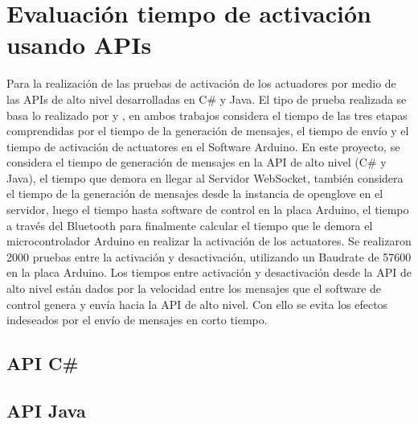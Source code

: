 \section{Evaluación tiempo de activación usando APIs}
 Para la realización de las pruebas de activación de los actuadores por medio de las APIs de alto nivel desarrolladas en C\# y Java. El tipo de prueba realizada se basa lo realizado por  \cite{tesis-monsalve-rodrigo} y  \cite{tesis-meneses-sebastian}, en ambos trabajos considera el tiempo de las tres etapas comprendidas por el tiempo de la generación de mensajes, el tiempo de envío y el tiempo de activación de actuatores en el Software Arduino. En este proyecto, se considera el tiempo de generación de mensajes en la API de alto nivel (C\# y Java), el tiempo que demora en llegar al Servidor WebSocket, también considera el tiempo de la generación de mensajes desde la instancia de openglove en el servidor, luego el tiempo hasta software de control en la placa Arduino, el tiempo a través del Bluetooth para finalmente calcular el tiempo que le demora el microcontrolador Arduino en realizar la activación de los actuatores. Se realizaron 2000 pruebas entre la activación y desactivación, utilizando un Baudrate de 57600 en la placa Arduino. Los tiempos entre activación y desactivación desde la API de alto nivel están dados por la velocidad entre los mensajes que el software de control genera y envía hacia la API de alto nivel. Con ello se evita los efectos indeseados por el envío de mensajes en corto tiempo. %
 
\subsection{API C\#}

\subsection{API Java}